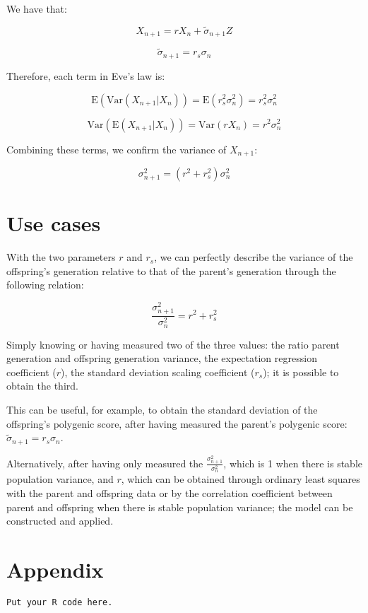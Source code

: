 \documentclass[a4paper,11pt]{article}
\begin{document}
We have that:

$$X_{n+1} = rX_n + \tilde{\sigma}_{n+1} Z$$

$$\tilde{\sigma}_{n+1} = r_s \sigma_n$$

Therefore, each term in Eve's law is:

$$\mathrm{E}(\mathrm{Var}(X_{n+1}|X_n)) = \mathrm{E}(r_s^2 \sigma_n^2) = r_s^2 \sigma_n^2$$

$$\mathrm{Var}(\mathrm{E}(X_{n+1}|X_n)) = \mathrm{Var}(rX_n) = r^2\sigma_n^2$$

Combining these terms, we confirm the variance of $X_{n+1}$:

$$\sigma_{n+1}^2 = (r^2+r_s^2)  \sigma_n^2$$





\section{Use cases}
With the two parameters $r$ and $r_s$, we can perfectly describe the variance of the offspring's generation relative to that of the parent's generation through the following relation:

$$\frac{\sigma_{n+1}^2}{\sigma_n^2} = r^2+r_s^2$$

Simply knowing or having measured two of the three values: the ratio parent generation and offspring generation variance, the expectation regression coefficient ($r$), the standard deviation scaling coefficient ($r_s$); it is possible to obtain the third.

This can be useful, for example, to obtain the standard deviation of the offspring's polygenic score, after having measured the parent's polygenic score: $\tilde{\sigma}_{n+1} = r_s \sigma_n$.

Alternatively, after having only measured the $\frac{\sigma_{n+1}^2}{\sigma_n^2}$, which is 1 when there is stable population variance, and $r$, which can be obtained through ordinary least squares with the parent and offspring data or by the correlation coefficient between parent and offspring when there is stable population variance; the model can be constructed and applied.



\clearpage
\section*{Appendix}
\begin{verbatim}
Put your R code here.
\end{verbatim}



\end{document}
